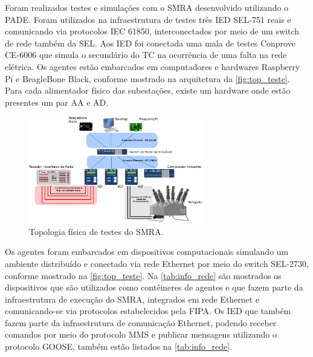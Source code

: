 \documentclass[journal]{IEEEtran}
\begin{document}
Foram realizados testes e simulações com o SMRA desenvolvido utilizando o PADE. Foram utilizados na infraestrutura de testes três IED SEL-751 reais e comunicando via protocolos IEC 61850, interconectados por meio de um switch de rede também da SEL. Aos IED foi conectada uma mala de testes Conprove CE-6006 que simula o secundário do TC na ocorrência de uma falta na rede elétrica. Os agentes estão embarcados em computadores e hardwares Raspberry Pi e BeagleBone Black, conforme mostrado na arquitetura da \autoref{fig:top_teste}. Para cada alimentador físico das subestações, existe um hardware onde estão presentes um par AA e AD.

\begin{figure}[htb]
    \centering
    \includegraphics[width=3.0in]{Figuras/topologia_de_testes.eps}
    \caption{\label{fig:top_teste} Topologia física de testes do SMRA.}    
\end{figure}

Os agentes foram embarcados em dispositivos computacionais  simulando um ambiente distribuído e conectado via rede Ethernet por meio do switch SEL-2730, conforme mostrado na \autoref{fig:top_teste}. Na \autoref{tab:info_rede} são mostrados os dispositivos que são utilizados como contêineres de agentes e que fazem parte da infraestrutura de execução do SMRA, integrados em rede Ethernet e comunicando-se via protocolos estabelecidos pela FIPA. Os IED que também fazem parte da infraestrutura de comunicação Ethernet, podendo receber comandos por meio do protocolo MMS e publicar mensagens utilizando o protocolo GOOSE, também estão listados na \autoref{tab:info_rede}.
\end{document}
